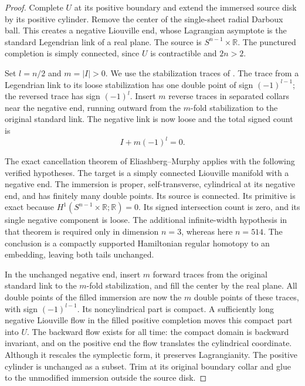 \documentclass[11pt]{article}
\numberwithin{equation}{section}
\theoremstyle{definition}
\theoremstyle{remark}
\begin{document}
\begin{proof}
Complete $U$ at its positive boundary and extend the immersed
source disk by its positive cylinder.  Remove the center of
the single-sheet radial Darboux ball.  This creates a negative
Liouville end, whose Lagrangian asymptote is the standard
Legendrian link of a real plane.  The source is
$S^{n-1}\times\mathbb R$.  The punctured completion is simply
connected, since $U$ is contractible and $2n>2$.

Set $l=n/2$ and $m=|I|>0$.  We use the stabilization traces
of \cite[Lemma~3.2 and proof of Lemma~3.4]{Top:EEMS}.
The trace from a Legendrian link to its loose stabilization
has one double point of sign $(-1)^{l-1}$; the reversed
trace has sign $(-1)^l$.  Insert $m$ reverse traces in
separated collars near the negative end, running outward
from the $m$-fold stabilization to the original standard
link.  The negative link is now loose and the total signed
count is
\[
           I+m(-1)^l=0.
\]

The exact cancellation theorem of Eliashberg--Murphy
\cite[Theorem~2.3]{Top:EMcaps} applies with the following
verified hypotheses.  The target is a simply connected
Liouville manifold with a negative end.  The immersion is
proper, self-transverse, cylindrical at its negative end,
and has finitely many double points.  Its source is
connected.  Its primitive is exact because
$H^1(S^{n-1}\times\mathbb R;\mathbb R)=0$.  Its signed intersection
count is zero, and its single negative component is loose.
The additional infinite-width hypothesis in that theorem
is required only in dimension $n=3$, whereas here $n=514$.
The conclusion is a compactly supported Hamiltonian
regular homotopy to an embedding, leaving both tails
unchanged.

In the unchanged negative end, insert $m$ forward traces
from the original standard link to the $m$-fold
stabilization, and fill the center by the real plane.
All double points of the filled immersion are now the
$m$ double points of these traces, with sign
$(-1)^{l-1}$.  Its noncylindrical part is compact.  A
sufficiently long negative Liouville flow in the filled
positive completion moves this compact part into $U$.
The backward flow exists for all time: the compact domain
is backward invariant, and on the positive end the flow
translates the cylindrical coordinate.  Although it
rescales the symplectic form, it preserves Lagrangianity.
The positive cylinder is unchanged as a subset.  Trim at
its original boundary collar and glue to the unmodified
immersion outside the source disk.


\end{proof}
\end{document}

